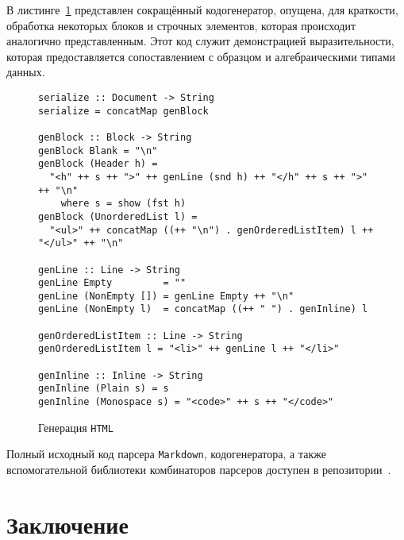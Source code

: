 В листинге~\ref{listing:HTMLGen} представлен сокращённый кодогенератор, опущена,
для краткости, обработка некоторых блоков и строчных элементов, которая
происходит аналогично представленным. Этот код служит демонстрацией
выразительности, которая предоставляется сопоставлением с образцом и
алгебраическими типами данных.

\begin{figure}[h]
\begin{lstlisting}
serialize :: Document -> String
serialize = concatMap genBlock

genBlock :: Block -> String
genBlock Blank = "\n"
genBlock (Header h) =
  "<h" ++ s ++ ">" ++ genLine (snd h) ++ "</h" ++ s ++ ">" ++ "\n"
    where s = show (fst h)
genBlock (UnorderedList l) =
  "<ul>" ++ concatMap ((++ "\n") . genOrderedListItem) l ++ "</ul>" ++ "\n"

genLine :: Line -> String
genLine Empty         = ""
genLine (NonEmpty []) = genLine Empty ++ "\n"
genLine (NonEmpty l)  = concatMap ((++ " ") . genInline) l

genOrderedListItem :: Line -> String
genOrderedListItem l = "<li>" ++ genLine l ++ "</li>"

genInline :: Inline -> String
genInline (Plain s) = s
genInline (Monospace s) = "<code>" ++ s ++ "</code>"
\end{lstlisting}
\caption{Генерация \lstinline{HTML}}
\label{listing:HTMLGen}
\end{figure}

Полный исходный код парсера \lstinline{Markdown}, кодогенератора, а также вспомогательной библиотеки комбинаторов парсеров доступен в репозитории~\cite{mdParse}.


\chapter{Заключение}

\printbibliography[heading=bibintoc%
]


